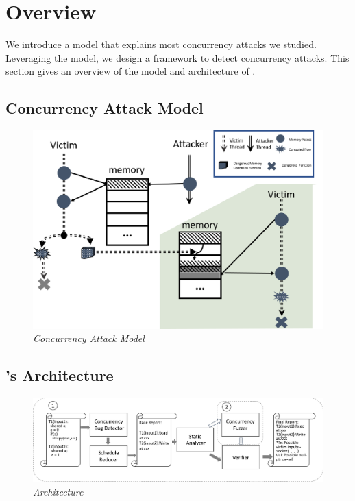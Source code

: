 
\section{Overview}\label{sec:overview}
We introduce a model that explains most concurrency attacks we studied. 
Leveraging the model, we design a framework \xxx
to detect concurrency attacks. 
This section gives an overview of the model and architecture of \xxx.

\subsection{Concurrency Attack Model}\label{sec:model}

\begin{figure}
	\centering
	\includegraphics[width=1\columnwidth]{figures/model}
	\vspace{-.25in}
	\caption{{\em Concurrency Attack Model}} 
	\label{fig:model}
	\vspace{-0.1in}
\end{figure}




\subsection{\xxx's Architecture}\label{sec:archi}
\begin{figure}
	\centering
	\includegraphics[width=1.8\columnwidth]{figures/archi}
	\vspace{0in}
	\caption{{\em Architecture}} 
	\label{fig:archi}
	\vspace{-0.1in}
\end{figure}



